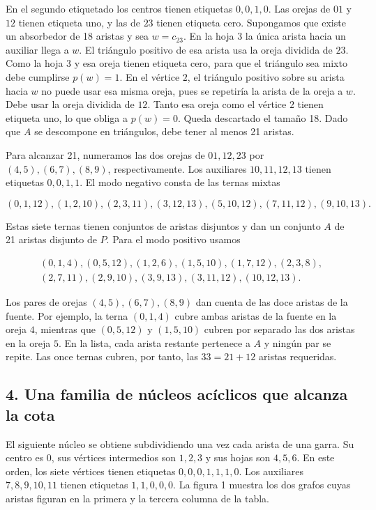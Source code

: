 \documentclass[spanish,11pt,a4paper]{article}
\begin{document}
En el segundo etiquetado los centros tienen etiquetas \(0,0,1,0\). Las orejas de \(01\) y \(12\) tienen etiqueta uno, y las de \(23\) tienen etiqueta cero. Supongamos que existe un absorbedor de 18 aristas y sea \(w=c_{23}\). En la hoja \(3\) la única arista hacia un auxiliar llega a \(w\). El triángulo positivo de esa arista usa la oreja dividida de \(23\). Como la hoja \(3\) y esa oreja tienen etiqueta cero, para que el triángulo sea mixto debe cumplirse \(p(w)=1\). En el vértice \(2\), el triángulo positivo sobre su arista hacia \(w\) no puede usar esa misma oreja, pues se repetiría la arista de la oreja a \(w\). Debe usar la oreja dividida de \(12\). Tanto esa oreja como el vértice \(2\) tienen etiqueta uno, lo que obliga a \(p(w)=0\). Queda descartado el tamaño 18. Dado que \(A\) se descompone en triángulos, debe tener al menos 21 aristas.

Para alcanzar 21, numeramos las dos orejas de \(01,12,23\) por \((4,5),(6,7),(8,9)\), respectivamente. Los auxiliares \(10,11,12,13\) tienen etiquetas \(0,0,1,1\). El modo negativo consta de las ternas mixtas

\[
(0,1,12), (1,2,10), (2,3,11), (3,12,13), (5,10,12), (7,11,12), (9,10,13).
\]

Estas siete ternas tienen conjuntos de aristas disjuntos y dan un conjunto \(A\) de 21 aristas disjunto de \(P\). Para el modo positivo usamos

\[
\begin{gathered}
(0,1,4), (0,5,12), (1,2,6), (1,5,10), (1,7,12), (2,3,8),\\
(2,7,11), (2,9,10), (3,9,13), (3,11,12), (10,12,13).
\end{gathered}
\]

Los pares de orejas \((4,5),(6,7),(8,9)\) dan cuenta de las doce aristas de la fuente. Por ejemplo, la terna \((0,1,4)\) cubre ambas aristas de la fuente en la oreja \(4\), mientras que \((0,5,12)\) y \((1,5,10)\) cubren por separado las dos aristas en la oreja \(5\). En la lista, cada arista restante pertenece a \(A\) y ningún par se repite. Las once ternas cubren, por tanto, las \(33=21+12\) aristas requeridas.

\subsection{4. Una familia de núcleos acíclicos que alcanza la cota}\label{una-familia-de-nuxfacleos-acuxedclicos-que-alcanza-la-cota}

El siguiente núcleo se obtiene subdividiendo una vez cada arista de una garra. Su centro es \(0\), sus vértices intermedios son \(1,2,3\) y sus hojas son \(4,5,6\). En este orden, los siete vértices tienen etiquetas \(0,0,0,1,1,1,0\). Los auxiliares \(7,8,9,10,11\) tienen etiquetas \(1,1,0,0,0\). La figura 1 muestra los dos grafos cuyas aristas figuran en la primera y la tercera columna de la tabla.
\end{document}
